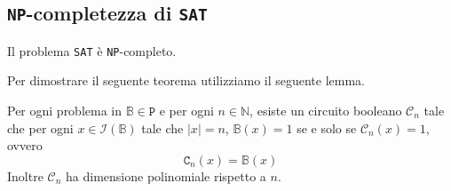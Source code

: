 \subsection{\texttt{NP}-completezza di \texttt{SAT}}

\begin{theorem}
    Il problema \texttt{SAT} è \texttt{NP}-completo.
\end{theorem}
Per dimostrare il seguente teorema utilizziamo il seguente lemma.
\begin{lemma}
    \label{lemma:np-completeness}
    Per ogni problema in $\mathbb{B} \in \texttt{P}$ e per ogni $n \in \mathbb{N}$,
    esiste un circuito booleano $\mathcal{C}_n$ tale che per ogni $x \in \mathcal{I}(\mathbb{B})$
    tale che $|x| = n$, $\mathbb{B}(x) = 1$ se e solo se $\mathcal{C}_n(x) = 1$, ovvero
    \[
        \texttt{C}_n(x) = \mathbb{B}(x)  
    \]
    Inoltre $\mathcal{C}_n$ ha dimensione polinomiale rispetto a $n$.
\end{lemma}
